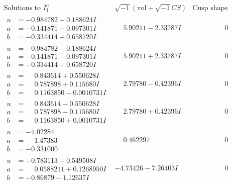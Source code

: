 \documentclass[1p]{elsarticle_modified}
\theoremstyle{definition}
\newcommand{\I}{\sqrt{-1}}
\begin{document}
$$\begin{array}{c|c|c}  
\text{Solutions to }I^u_{1}& \I (\text{vol} + \sqrt{-1}CS) & \text{Cusp shape}\\
 \hline 
\begin{aligned}
u &= -0.984782 + 0.188624 I \\
a &= -0.141871 + 0.097301 I \\
b &= -0.334414 + 0.658720 I\end{aligned}
 & \phantom{-}5.90211 - 2.33787 I & \phantom{-0.000000 } 0 \\ \hline\begin{aligned}
u &= -0.984782 - 0.188624 I \\
a &= -0.141871 - 0.097301 I \\
b &= -0.334414 - 0.658720 I\end{aligned}
 & \phantom{-}5.90211 + 2.33787 I & \phantom{-0.000000 } 0 \\ \hline\begin{aligned}
u &= \phantom{-}0.843614 + 0.550628 I \\
a &= \phantom{-}0.787898 + 0.115680 I \\
b &= \phantom{-}0.1163850 - 0.0010731 I\end{aligned}
 & \phantom{-}2.79780 - 0.42396 I & \phantom{-0.000000 } 0 \\ \hline\begin{aligned}
u &= \phantom{-}0.843614 - 0.550628 I \\
a &= \phantom{-}0.787898 - 0.115680 I \\
b &= \phantom{-}0.1163850 + 0.0010731 I\end{aligned}
 & \phantom{-}2.79780 + 0.42396 I & \phantom{-0.000000 } 0 \\ \hline\begin{aligned}
u &= -1.02284\phantom{ +0.000000I} \\
a &= \phantom{-}1.47383\phantom{ +0.000000I} \\
b &= -0.331000\phantom{ +0.000000I}\end{aligned}
 & \phantom{-}0.462297\phantom{ +0.000000I} & \phantom{-0.000000 } 0 \\ \hline\begin{aligned}
u &= -0.783113 + 0.549508 I \\
a &= \phantom{-}0.0588211 + 0.1268950 I \\
b &= -0.86879 - 1.12637 I\end{aligned}
 & -4.73426 - 7.26403 I & \phantom{-0.000000 } 0 \\ \hline\begin{aligned}

\end{aligned}
\end{array}$$
\end{document}
